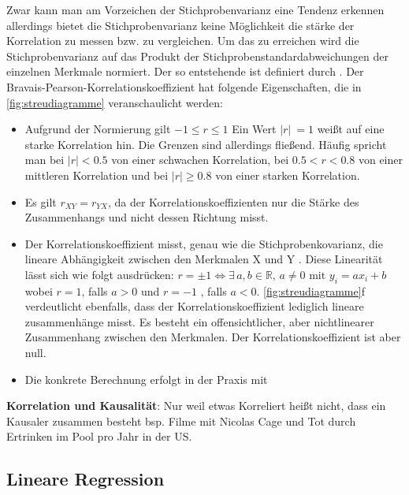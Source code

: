 Zwar kann man am Vorzeichen der Stichprobenvarianz eine Tendenz erkennen allerdings bietet die Stichprobenvarianz keine Möglichkeit die stärke der Korrelation zu messen bzw. zu vergleichen. Um das zu erreichen wird die Stichprobenvarianz auf das Produkt der Stichprobenstandardabweichungen der einzelnen Merkmale normiert. Der so entstehende  ist definiert durch . Der Bravais-Pearson-Korrelationskoeffizient hat folgende Eigenschaften, die in \cref{fig:streudiagramme} veranschaulicht werden:
\begin{itemize}[leftmargin=*]
    \itemsep0em 
    \item Aufgrund der Normierung gilt $-1 \le r \le 1$ Ein Wert $|r|~=1$ weißt auf eine starke Korrelation hin. Die Grenzen sind allerdings fließend. Häufig spricht man bei $|r| < 0.5$ von einer schwachen  Korrelation, bei $0.5 < r < 0.8$ von einer mittleren Korrelation und bei $|r| \ge 0.8$ von einer starken Korrelation.
    \item Es gilt $r_{XY} = r_{YX}$, da der Korrelationskoeffizienten nur die Stärke des Zusammenhangs und nicht dessen Richtung misst.
    \item Der Korrelationskoeffizient misst, genau wie die Stichprobenkovarianz, die lineare Abhängigkeit zwischen den Merkmalen X und Y . Diese Linearität lässt sich wie folgt ausdrücken: $r = \pm 1 \Leftrightarrow \exists\, a, b \in \mathds{R},\, a \neq 0 \text{ mit } y_i = ax_i + b$ wobei $r = 1$, falls $a > 0$ und $r = -1$ , falls $a < 0$. \cref{fig:streudiagramme}f verdeutlicht ebenfalls, dass der Korrelationskoeffizient lediglich lineare zusammenhänge misst. Es besteht ein offensichtlicher, aber nichtlinearer Zusammenhang zwischen den Merkmalen. Der Korrelationskoeffizient ist aber null.
    \item Die konkrete Berechnung erfolgt in der Praxis mit 
\end{itemize}
\textbf{Korrelation und Kausalität}: Nur weil etwas Korreliert heißt nicht, dass ein Kausaler zusammen besteht bsp. Filme mit Nicolas Cage und Tot durch Ertrinken im Pool pro Jahr in der US.\\

\subsection{Lineare Regression}
